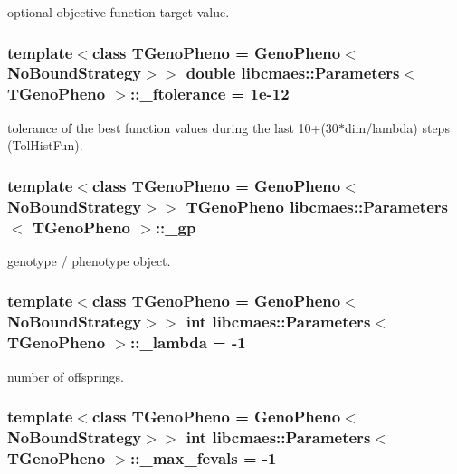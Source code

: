 optional objective function target value. \hypertarget{classlibcmaes_1_1Parameters_ab6c11cc112b5709e9039967e881c808e}{
\subsubsection[{\-\_\-ftolerance}]{\setlength{\rightskip}{0pt plus 5cm}template$<$class T\-Geno\-Pheno = Geno\-Pheno$<$\-No\-Bound\-Strategy$>$$>$ double {\bf libcmaes\-::\-Parameters}$<$ T\-Geno\-Pheno $>$\-::\-\_\-ftolerance = 1e-\/12\hspace{0.3cm}{\ttfamily [protected]}}}\label{classlibcmaes_1_1Parameters_ab6c11cc112b5709e9039967e881c808e}
tolerance of the best function values during the last 10+(30$\ast$dim/lambda) steps (Tol\-Hist\-Fun). \hypertarget{classlibcmaes_1_1Parameters_ab8e153b4785de9358599caa840b94ef2}{
\subsubsection[{\-\_\-gp}]{\setlength{\rightskip}{0pt plus 5cm}template$<$class T\-Geno\-Pheno = Geno\-Pheno$<$\-No\-Bound\-Strategy$>$$>$ T\-Geno\-Pheno {\bf libcmaes\-::\-Parameters}$<$ T\-Geno\-Pheno $>$\-::\-\_\-gp\hspace{0.3cm}{\ttfamily [protected]}}}\label{classlibcmaes_1_1Parameters_ab8e153b4785de9358599caa840b94ef2}
genotype / phenotype object. \hypertarget{classlibcmaes_1_1Parameters_af732f7206f23cbd6ec2bbd4e217a9a2b}{
\subsubsection[{\-\_\-lambda}]{\setlength{\rightskip}{0pt plus 5cm}template$<$class T\-Geno\-Pheno = Geno\-Pheno$<$\-No\-Bound\-Strategy$>$$>$ int {\bf libcmaes\-::\-Parameters}$<$ T\-Geno\-Pheno $>$\-::\-\_\-lambda = -\/1\hspace{0.3cm}{\ttfamily [protected]}}}\label{classlibcmaes_1_1Parameters_af732f7206f23cbd6ec2bbd4e217a9a2b}
number of offsprings. \hypertarget{classlibcmaes_1_1Parameters_ad316488121bd51f62b28e8183d591c9e}{
\subsubsection[{\-\_\-max\-\_\-fevals}]{\setlength{\rightskip}{0pt plus 5cm}template$<$class T\-Geno\-Pheno = Geno\-Pheno$<$\-No\-Bound\-Strategy$>$$>$ int {\bf libcmaes\-::\-Parameters}$<$ T\-Geno\-Pheno $>$\-::\-\_\-max\-\_\-fevals = -\/1\hspace{0.3cm}{\ttfamily [protected]}}}\label{classlibcmaes_1_1Parameters_ad316488121bd51f62b28e8183d591c9e}
